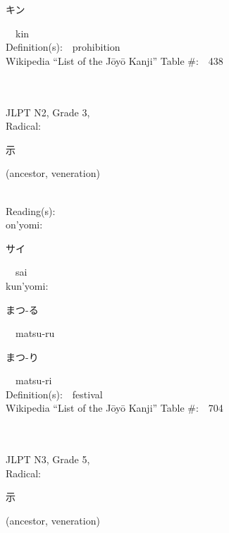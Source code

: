 \begin{multicols}{2}
{\hspace*{2em}}{\begin{CJK}{UTF8}{min} キン \end{CJK}}\ \ kin\ \ \\
Definition(s):\ \ prohibition \\
Wikipedia ``List of the J\=oy\=o Kanji'' Table \#:\ \ 438 \\
\ \ \\
{\fontsize{34pt}{40pt}  }\ \ \\  %
{JLPT N2, Grade 3, \\Radical:\ \ {\begin{CJK}{UTF8}{min} 示 \end{CJK}} (ancestor, veneration) } \\
Reading(s):\ \ \\
{\hspace*{1em}}on'yomi:\ \ \\
{\hspace*{2em}}{\begin{CJK}{UTF8}{min} サイ \end{CJK}}\ \ sai\ \ \\
{\hspace*{1em}}kun'yomi:\ \ \\
{\hspace*{2em}}{\begin{CJK}{UTF8}{min} まつ-る \end{CJK}}\ \ matsu-ru\ \ \\
{\hspace*{2em}}{\begin{CJK}{UTF8}{min} まつ-り \end{CJK}}\ \ matsu-ri\ \ \\
Definition(s):\ \ festival \\
Wikipedia ``List of the J\=oy\=o Kanji'' Table \#:\ \ 704 \\
\ \ \\
{\fontsize{34pt}{40pt}  }\ \ \\  %
{JLPT N3, Grade 5, \\Radical:\ \ {\begin{CJK}{UTF8}{min} 示 \end{CJK}} (ancestor, veneration) } \\

\end{multicols}
